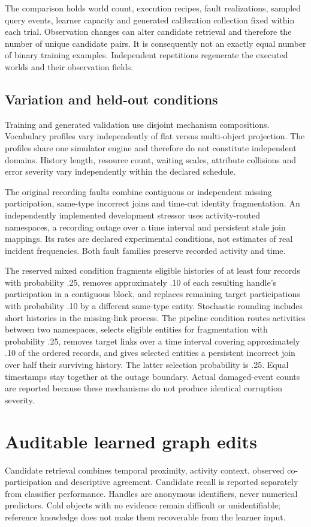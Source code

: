 \documentclass[11pt]{article}
\begin{document}
The comparison holds world count, execution recipes, fault realizations, sampled query events, learner capacity and generated calibration collection fixed within each trial. Observation changes can alter candidate retrieval and therefore the number of unique candidate pairs. It is consequently not an exactly equal number of binary training examples. Independent repetitions regenerate the executed worlds and their observation fields.

\subsection{Variation and held-out conditions}
Training and generated validation use disjoint mechanism compositions. Vocabulary profiles vary independently of flat versus multi-object projection. The profiles share one simulator engine and therefore do not constitute independent domains. History length, resource count, waiting scales, attribute collisions and error severity vary independently within the declared schedule.

The original recording faults combine contiguous or independent missing participation, same-type incorrect joins and time-cut identity fragmentation. An independently implemented development stressor uses activity-routed namespaces, a recording outage over a time interval and persistent stale join mappings. Its rates are declared experimental conditions, not estimates of real incident frequencies. Both fault families preserve recorded activity and time.

The reserved mixed condition fragments eligible histories of at least four records with probability .25, removes approximately .10 of each resulting handle's participation in a contiguous block, and replaces remaining target participations with probability .10 by a different same-type entity. Stochastic rounding includes short histories in the missing-link process. The pipeline condition routes activities between two namespaces, selects eligible entities for fragmentation with probability .25, removes target links over a time interval covering approximately .10 of the ordered records, and gives selected entities a persistent incorrect join over half their surviving history. The latter selection probability is .25. Equal timestamps stay together at the outage boundary. Actual damaged-event counts are reported because these mechanisms do not produce identical corruption severity.

\section{Auditable learned graph edits}
Candidate retrieval combines temporal proximity, activity context, observed co-participation and descriptive agreement. Candidate recall is reported separately from classifier performance. Handles are anonymous identifiers, never numerical predictors. Cold objects with no evidence remain difficult or unidentifiable; reference knowledge does not make them recoverable from the learner input.
\end{document}
